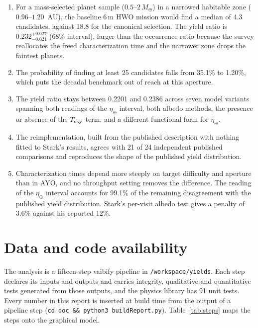 \documentclass[11pt,a4paper]{article}
\begin{document}
\begin{enumerate}
\item For a mass-selected planet sample ($0.5$--$2\,M_\oplus$) in a narrowed habitable zone
($0.96$--$1.20$~AU), the baseline 6\,m HWO mission would find a median of 4.3 candidates,
against 18.8 for the canonical selection. The yield ratio is
$0.232^{+0.027}_{-0.021}$ (68\% interval), larger than the occurrence ratio because the survey
reallocates the freed characterization time and the narrower zone drops the faintest planets.
\item The probability of finding at least 25 candidates falls from 35.1\% to
1.20\%, which puts the decadal benchmark out of reach at this aperture.
\item The yield ratio stays between 0.2201 and 0.2386 across seven model variants spanning both readings of
the $\eta_\oplus$ interval, both albedo methods, the presence or absence of the $T_{\rm sky}$ term,
and a different functional form for $\eta_\oplus$.
\item The reimplementation, built from the published description with nothing fitted to Stark's
results, agrees with 21 of 24 independent published comparisons and reproduces the
shape of the published yield distribution.
\item Characterization times depend more steeply on target difficulty and aperture than in AYO, and
no throughput setting removes the difference. The reading of the $\eta_\oplus$ interval accounts
for 99.1\% of the remaining disagreement with the published yield distribution. Stark's
per-visit albedo test gives a penalty of 3.6\% against his reported 12\%.
\end{enumerate}

\section*{Data and code availability}

The analysis is a fifteen-step vaibify pipeline in \texttt{/workspace/yields}. Each step declares
its inputs and outputs and carries integrity, qualitative and quantitative tests generated from
those outputs, and the physics library has 91 unit tests. Every number in this report is inserted
at build time from the output of a pipeline step (\texttt{cd doc \&\& python3 buildReport.py}).
Table~\ref{tab:steps} maps the steps onto the graphical model.
\end{document}
